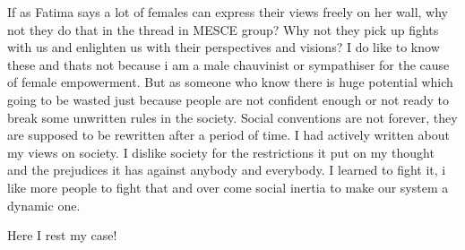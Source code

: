 If as Fatima says a lot of females can express their views freely on her wall, why not they do 
that in the thread in MESCE group? Why not they pick up fights with us and enlighten us 
with their perspectives and visions? I do like to know these and thats not because i am a male chauvinist 
or sympathiser for the cause of female empowerment. But as someone who know there is huge potential which going 
to be wasted just because people are not confident enough or not ready to break some unwritten rules in the society. 
Social conventions are not forever, they are supposed to be rewritten after a period of time. 
I had actively written about my views on society. I dislike society for the restrictions it put on my thought and 
the prejudices it has against anybody and everybody. I learned to fight it, i like more people to fight that and 
over come social inertia to make our system a dynamic one.

Here I rest my case!


\newpage
